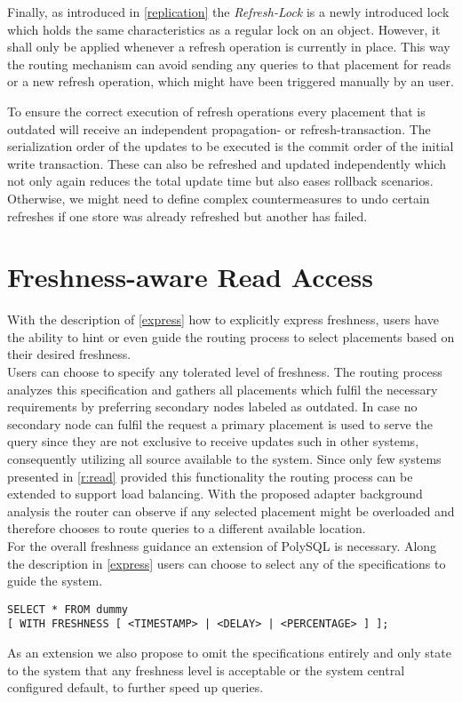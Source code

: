 Finally, as introduced in \ref{replication} the \emph{Refresh-Lock} is a newly introduced lock which holds the same characteristics as a regular lock on an object.
However, it shall only be applied whenever a refresh operation is currently in place. This way the routing mechanism can avoid sending any queries to that placement
for reads or a new refresh operation, which might have been triggered manually by an user.

To ensure the correct execution of refresh operations every placement that is outdated will receive an independent propagation- or refresh-transaction.
The serialization order of the updates to be executed is the commit order of the initial write transaction.
These can also be refreshed and updated independently which not only again reduces the total update time but also eases rollback scenarios.
Otherwise, we might need to define complex countermeasures to undo certain refreshes if one store was already refreshed but another has failed.



\section{Freshness-aware Read Access}

With the description of \ref{express} how to explicitly express freshness, users have the ability to hint or even guide the routing process to select placements 
based on their desired freshness.\\
Users can choose to specify any tolerated level of freshness. The routing process analyzes this specification and gathers all placements which fulfil the necessary 
requirements by preferring secondary nodes labeled as outdated.
In case no secondary node can fulfil the request a primary placement is used to serve the query since they are not exclusive to receive updates such in other systems,
consequently utilizing all source available to the system.
Since only few systems presented in \ref{r:read} provided this functionality the routing process can be extended to support load balancing. 
With the proposed adapter background analysis the router can observe if any selected placement might be overloaded and therefore chooses to route 
queries to a different available location. \\



For the overall freshness guidance an extension of PolySQL is necessary.
Along the description in \ref{express} users can choose to select any of the specifications to guide the system.
\begin{verbatim}
SELECT * FROM dummy 
[ WITH FRESHNESS [ <TIMESTAMP> | <DELAY> | <PERCENTAGE> ] ];
\end{verbatim}
As an extension we also propose to omit the specifications entirely and only state to the system that any freshness level is acceptable or the system central
configured default, to further speed up queries.



